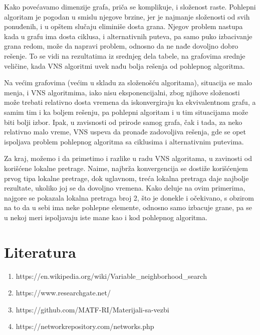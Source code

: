 \documentclass{article}
\begin{document}
Kako povećavamo dimenzije grafa, priča se komplikuje, i složenost raste. Pohlepni algoritam je pogodan u smislu njegove brzine, jer je najmanje složenosti od svih ponuđenih, i u opštem slučaju eliminiše dosta grana. Njegov problem nastupa kada u grafu ima dosta ciklusa, i alternativnih puteva, pa samo puko izbacivanje grana redom, može da napravi problem, odnosno da ne nađe dovoljno dobro rešenje. To se vidi na rezultatima iz srednjeg dela tabele, na grafovima srednje veličine, kada VNS algoritmi uvek nađu bolja rešenja od pohlepnog algoritma.
\newline

Na većim grafovima (većim u skladu za složenošću algoritama), situacija se malo menja, i VNS algoritmima, iako nisu eksponencijalni, zbog njihove složenosti može trebati relativno dosta vremena da iskonvergiraju ka ekvivalentnom grafu, a samim tim i ka boljem rešenju, pa pohlepni algoritam i u tim situacijama može biti bolji izbor. Ipak, u zavisnosti od prirode samog grafa, čak i tada, za neko relativno malo vreme, VNS uspeva da pronađe zadovoljiva rešenja, gde se opet ispoljava problem pohlepnog algoritma sa ciklusima i alternativnim putevima.
\newline

Za kraj, možemo i da primetimo i razlike u radu VNS algoritama, u zavinosti od korišćene lokalne pretrage. Naime, najbrža konvergencija se dostiže korišćenjem prvog tipa lokalne pretrage, dok uglavnom, treća lokalna pretraga daje najbolje rezultate, ukoliko joj se da dovoljno vremena. Kako deluje na ovim primerima, najgore se pokazala lokalna pretraga broj 2, što je donekle i očekivano, s obzirom na to da u sebi ima neke pohlepne elemente, odnosno samo izbacuje grane, pa se u nekoj meri ispoljavaju iste mane kao i kod pohlepnog algoritma.


\newpage
\section*{\huge Literatura}\label{sec:literatura}
\begin{enumerate}
  \setcounter{enumi}{0}
  \renewcommand{\labelenumi}{[\arabic{enumi}]}
  \item https://en.wikipedia.org/wiki/Variable\_neighborhood\_search
  \item https://www.researchgate.net/
  \item https://github.com/MATF-RI/Materijali-sa-vezbi
  \item https://networkrepository.com/networks.php
\end{enumerate}
\end{document}
